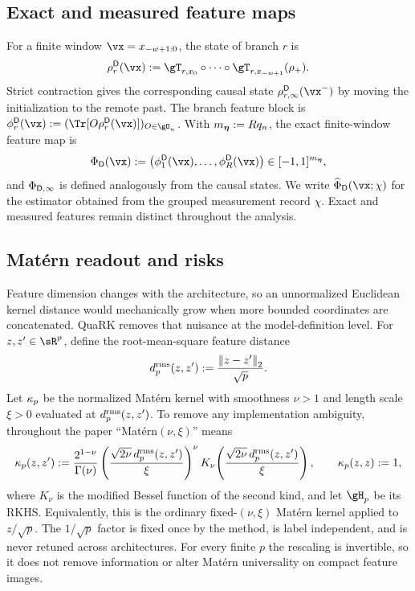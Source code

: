 \subsection{Exact and measured feature maps}

For a finite window $\vx=x_{-w+1:0}$, the state of branch $r$ is
\[
    \rho_r^{\design}(\vx)
    :=\reservoirChannel_{r,x_0}\circ\cdots\circ
      \reservoirChannel_{r,x_{-w+1}}(\rhoreset).
\]
Strict contraction gives the corresponding causal state
$\rho_{r,\infty}^{\design}(\vx^-)$ by moving the initialization to the remote
past.  The branch feature block is
$\phi_r^{\design}(\vx):=(\Tr[O\rho_r^{\design}(\vx)])_{O\in\gO_n}$.
With $m_{\bm{\eta}}:=Rq_n$, the exact finite-window feature map is
\begin{equation}
    \featureMap_{\design}(\vx)
    :=\bigl(\phi_1^{\design}(\vx),\ldots,\phi_R^{\design}(\vx)\bigr)
    \in[-1,1]^{m_{\arch}},
    \label{eq:exact-window-features}
\end{equation}
and $\Phi_{\mathsf D,\infty}$ is defined analogously from the causal
states.  We write $\measuredFeatureMap_{\design}(\vx;\chi)$ for the estimator
obtained from the grouped measurement record $\chi$.  Exact and measured
features remain distinct throughout the analysis.

\subsection{Mat\'ern readout and risks}
\label{sec:readout-risks}

Feature dimension changes with the architecture, so an unnormalized Euclidean
kernel distance would mechanically grow when more bounded coordinates are
concatenated.  QuaRK removes that nuisance at the model-definition level.  For
$z,z'\in\sR^p$, define the root-mean-square feature distance
\begin{equation}
    d^{\mathrm{rms}}_p(z,z')
    :=\frac{\left\lVert z-z'\right\rVert_2}{\sqrt p}.
    \label{eq:rms-feature-metric}
\end{equation}
Let $\kappa_p$ be the normalized Mat\'ern kernel with smoothness $\nu>1$ and
length scale $\xi>0$ evaluated at $d^{\mathrm{rms}}_p(z,z')$.  To remove any
implementation ambiguity, throughout the paper ``Mat\'ern$(\nu,\xi)$'' means
\begin{equation}
    \kappa_p(z,z')
    :=\frac{2^{1-\nu}}{\Gamma(\nu)}
      \left(\frac{\sqrt{2\nu}\,d^{\mathrm{rms}}_p(z,z')}{\xi}\right)^{\nu}
      K_{\nu}\!\left(\frac{\sqrt{2\nu}\,d^{\mathrm{rms}}_p(z,z')}{\xi}\right),
    \qquad \kappa_p(z,z):=1,
    \label{eq:matern-kernel-definition}
\end{equation}
where $K_{\nu}$ is the modified Bessel function of the second kind, and let
$\RKHS_p$ be its RKHS.  Equivalently, this is the ordinary fixed-$(\nu,\xi)$
Mat\'ern kernel applied to $z/\sqrt p$.  The $1/\sqrt p$ factor is fixed once
by the method, is label independent, and is never retuned across
architectures.  For every finite $p$ the rescaling is invertible, so it does
not remove information or alter Mat\'ern universality on compact feature
images.

